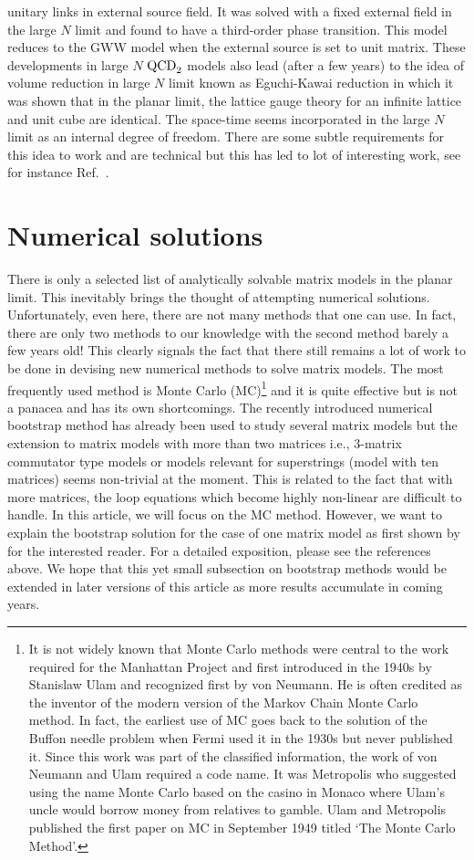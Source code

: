 \documentclass[letter,11pt]{article}
\begin{document}
unitary links in external source field. It was solved with a fixed external field in the large $N$ limit and found to have a 
third-order phase transition. This model reduces to the GWW model when the external source is set to unit matrix. 
These developments in large $N$ $\rm{QCD}_{2}$ models also lead (after a few years) to the idea of volume reduction 
in large $N$ limit known as Eguchi-Kawai reduction \cite{Eguchi:1982nm} in which it was shown that in the planar limit, 
the lattice gauge theory for an infinite lattice and unit cube are identical. The space-time seems incorporated in the large 
$N$ limit as an internal degree of freedom. There are some subtle requirements for this idea to work and are technical 
but this has led to lot of interesting work, see for instance Ref.~\cite{Kovtun:2007py}. 
 
\section{\label{sec:NSOL}Numerical solutions} 
There is only a selected list of analytically solvable matrix models in the planar limit. This inevitably brings 
the thought of attempting numerical solutions. Unfortunately, even here, there are not many methods that one can use. 
In fact, there are only two methods to our knowledge with the second method barely a few years old! This clearly signals 
the fact that there still remains a lot of work to be done in devising new numerical 
methods to solve matrix models. The most frequently used method is Monte Carlo (MC)\footnote{
It is not widely known that Monte Carlo methods were central to the work required for the Manhattan Project
and first introduced in the 1940s by Stanislaw Ulam and recognized first by von Neumann. 
He is often credited as the inventor of the modern version of the Markov Chain Monte Carlo 
method. In fact, the earliest use of MC goes back to the solution of the Buffon needle problem when Fermi used it in the 
1930s but never published it. 
Since this work was part of the classified information, the work of von Neumann and Ulam required a code name. It was Metropolis who 
suggested using the name Monte Carlo based on the casino in 
Monaco where Ulam's uncle would borrow money from relatives to gamble. Ulam and Metropolis
published the first paper on MC in September 1949 titled `The Monte Carlo Method'.} 
and it is quite effective but is not a panacea and has its own shortcomings. 
The recently introduced numerical bootstrap method has already been used to study several matrix models \cite{Anderson:2016rcw,Lin:2020mme,Han:2020bkb,Kazakov:2021lel} but the extension to matrix models with more than two matrices i.e., 3-matrix commutator type models or models relevant for superstrings (model with ten matrices) seems non-trivial at the moment. This is related to the fact that with more matrices, the loop equations which become highly non-linear are difficult to handle. In this article, we will focus on the MC method. However, we want to explain the bootstrap solution for the case of one matrix model as first shown by \cite{Lin:2020mme} for the interested reader. For a detailed exposition, please see the references above. We hope that this yet small subsection on bootstrap methods would be extended in later versions of this article as more results accumulate in coming years. 
\end{document}
